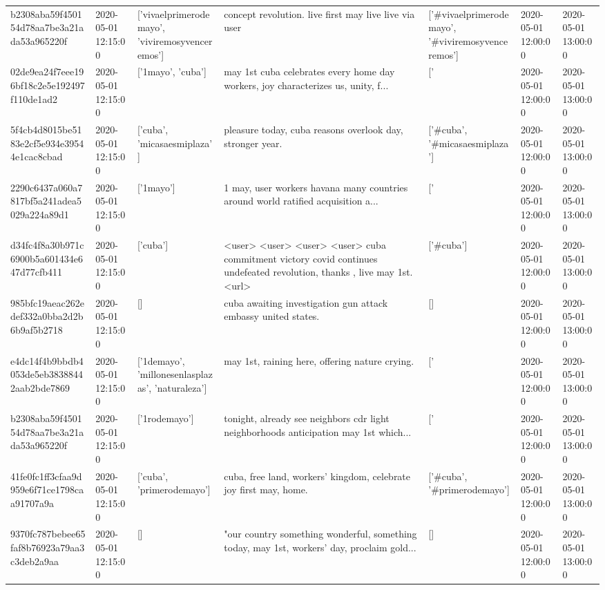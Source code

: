 \begin{tabular}{lllllll}
b2308aba59f450154d78aa7be3a21ada53a965220f & 2020-05-01 12:15:00 & ['vivaelprimerodemayo', 'viviremosyvenceremos'] & concept revolution. live first may live live via user & ['#vivaelprimerodemayo', '#viviremosyvenceremos'] & 2020-05-01 12:00:00 & 2020-05-01 13:00:00 \\
02de9ea24f7eee196bf18c2e5e192497f110de1ad2 & 2020-05-01 12:15:00 & ['1mayo', 'cuba'] & may 1st cuba celebrates every home day workers, joy characterizes us, unity, f... & ['#1mayo', '#cuba'] & 2020-05-01 12:00:00 & 2020-05-01 13:00:00 \\
5f4cb4d8015be5183e2cf5e934e39544e1cac8cbad & 2020-05-01 12:15:00 & ['cuba', 'micasaesmiplaza'] & pleasure today, cuba reasons overlook day, stronger year. & ['#cuba', '#micasaesmiplaza'] & 2020-05-01 12:00:00 & 2020-05-01 13:00:00 \\
2290c6437a060a7817bf5a241adea5029a224a89d1 & 2020-05-01 12:15:00 & ['1mayo'] & 1 may, user workers havana many countries around world ratified acquisition a... & ['#1mayo'] & 2020-05-01 12:00:00 & 2020-05-01 13:00:00 \\
d34fc4f8a30b971c6900b5a601434e647d77cfb411 & 2020-05-01 12:15:00 & ['cuba'] & <user> <user> <user> <user> cuba commitment victory covid continues undefeated revolution, thanks , live may 1st. <url> & ['#cuba'] & 2020-05-01 12:00:00 & 2020-05-01 13:00:00 \\
985bfc19aeac262edef332a0bba2d2b6b9af5b2718 & 2020-05-01 12:15:00 & [] & cuba awaiting investigation gun attack embassy united states. & [] & 2020-05-01 12:00:00 & 2020-05-01 13:00:00 \\
e4dc14f4b9bbdb4053de5eb38388442aab2bde7869 & 2020-05-01 12:15:00 & ['1demayo', 'millonesenlasplazas', 'naturaleza'] & may 1st, raining here, offering nature crying. & ['#1demayo'] & 2020-05-01 12:00:00 & 2020-05-01 13:00:00 \\
b2308aba59f450154d78aa7be3a21ada53a965220f & 2020-05-01 12:15:00 & ['1rodemayo'] & tonight, already see neighbors cdr light neighborhoods anticipation may 1st which... & ['#1rodemayo'] & 2020-05-01 12:00:00 & 2020-05-01 13:00:00 \\
41fe0fc1ff3cfaa9d959e6f71ce1798caa91707a9a & 2020-05-01 12:15:00 & ['cuba', 'primerodemayo'] & cuba, free land, workers' kingdom, celebrate joy first may, home. & ['#cuba', '#primerodemayo'] & 2020-05-01 12:00:00 & 2020-05-01 13:00:00 \\
9370fc787bebee65faf8b76923a79aa3c3deb2a9aa & 2020-05-01 12:15:00 & [] & "our country something wonderful, something today, may 1st, workers' day, proclaim gold... & [] & 2020-05-01 12:00:00 & 2020-05-01 13:00:00 \\

\end{tabular}
